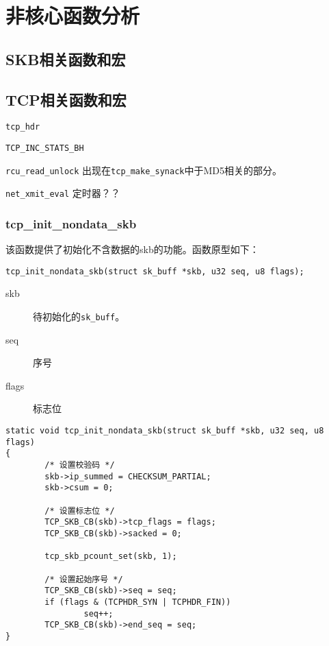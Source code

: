 \chapter{非核心函数分析}

\minitoc

\section{SKB相关函数和宏}

\section{TCP相关函数和宏}
    \texttt{tcp_hdr}

    \texttt{TCP_INC_STATS_BH}

    \texttt{rcu_read_unlock} 出现在\texttt{tcp_make_synack}中于MD5相关的部分。
    
    \texttt{net_xmit_eval}   定时器？？
\subsection{tcp\_init\_nondata\_skb}
该函数提供了初始化不含数据的skb的功能。函数原型如下：
\begin{verbatim}
tcp_init_nondata_skb(struct sk_buff *skb, u32 seq, u8 flags);
\end{verbatim}

\begin{description}
  \item[skb] 待初始化的\texttt{sk_buff}。
  \item[seq] 序号
  \item[flags] 标志位
\end{description}

\begin{verbatim}
static void tcp_init_nondata_skb(struct sk_buff *skb, u32 seq, u8 flags)
{
        /* 设置校验码 */
        skb->ip_summed = CHECKSUM_PARTIAL;
        skb->csum = 0;

        /* 设置标志位 */
        TCP_SKB_CB(skb)->tcp_flags = flags;
        TCP_SKB_CB(skb)->sacked = 0;

        tcp_skb_pcount_set(skb, 1);

        /* 设置起始序号 */
        TCP_SKB_CB(skb)->seq = seq;
        if (flags & (TCPHDR_SYN | TCPHDR_FIN))
                seq++;
        TCP_SKB_CB(skb)->end_seq = seq;
}
\end{verbatim}

